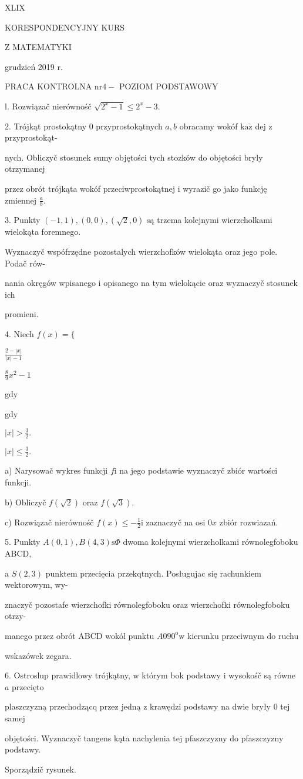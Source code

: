 \documentclass[a4paper,12pt]{article}
\begin{document}
XLIX

KORESPONDENCYJNY KURS

Z MATEMATYKI

grudzień 2019 r.

PRACA KONTROLNA $\mathrm{n}\mathrm{r} 4-$ POZIOM PODSTAWOWY

l. Rozwiązač nierównośč $\sqrt{2^{x}-1}\leq 2^{x}-3.$

2. Trójkąt prostokątny $0$ przyprostokątnych $a, b$ obracamy wokóf $\mathrm{k}\mathrm{a}\dot{\mathrm{z}}$ dej $\mathrm{z}$ przyprostokąt-

nych. Obliczyč stosunek sumy objętości tych stozków do objętości bryly otrzymanej

przez obrót trójkąta wokóf przeciwprostokątnej $\mathrm{i}$ wyrazič go jako funkcję zmiennej $\displaystyle \frac{a}{b}.$

3. Punkty $(-1,1), (0,0), (\sqrt{2},0)$ są trzema kolejnymi wierzcholkami wielokąta foremnego.

Wyznaczyč wspófrzędne pozostalych wierzchofków wielokąta oraz jego pole. Podač rów-

nania okręgów wpisanego $\mathrm{i}$ opisanego na tym wielokącie oraz wyznaczyč stosunek ich

promieni.

4. Niech $f(x)=\{$

$\displaystyle \frac{2-|x|}{|x|-1}$

$\displaystyle \frac{8}{9}x^{2}-1$

gdy

gdy

$|x|>\displaystyle \frac{3}{2}.$

$|x|\displaystyle \leq\frac{3}{2}.$

a) Narysowač wykres funkcji $f\mathrm{i}$ na jego podstawie wyznaczyč zbiór wartości funkcji.

b) Obliczyč $f(\sqrt{2})$ oraz $f(\sqrt{3}).$

c) Rozwiązač nierównośč $f(x)\displaystyle \leq-\frac{1}{2}\mathrm{i}$ zaznaczyč na osi $0x$ zbiór rozwiazań.

5. Punkty $A(0,1), B(4,3) \mathrm{s}\Phi$ dwoma kolejnymi wierzcholkami równolegfoboku ABCD,

a $S(2,3)$ punktem przecięcia przekqtnych. Posługujac się rachunkiem wektorowym, wy-

znaczyč pozostafe wierzchofki równolegfoboku oraz wierzchofki równolegfoboku otrzy-

manego przez obrót ABCD wokól punktu $A090^{\mathrm{o}} \mathrm{w}$ kierunku przeciwnym do ruchu

wskazówek zegara.

6. Ostroslup prawidlowy trójkątny, $\mathrm{w}$ którym bok podstawy $\mathrm{i}$ wysokośč są równe $a$ przecięto

plaszczyzną przechodzącq przez jedną $\mathrm{z}$ krawędzi podstawy na dwie bryły $0$ tej samej

objętości. Wyznaczyč tangens kąta nachylenia tej pfaszczyzny do pfaszczyzny podstawy.

Sporządzič rysunek.
\end{document}
